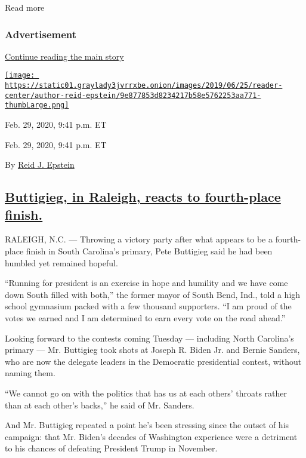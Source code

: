 Read more

\hypertarget{advertisement}{%
\subsubsection{Advertisement}\label{advertisement}}

\protect\hyperlink{after-dfp-ad-mid1}{Continue reading the main story}

\href{https://www.nytimes3xbfgragh.onion/by/reid-j-epstein}{\texttt{[image: https://static01.graylady3jvrrxbe.onion/images/2019/06/25/reader-center/author-reid-epstein/9e877853d8234217b58e5762253aa771-thumbLarge.png]}}

Feb. 29, 2020, 9:41 p.m. ET

Feb. 29, 2020, 9:41 p.m. ET

By \href{https://www.nytimes3xbfgragh.onion/by/reid-j-epstein}{Reid J.
Epstein}

\hypertarget{buttigieg-in-raleigh-reacts-to-fourth-place-finish}{%
\subsection{\texorpdfstring{\protect\hyperlink{pete-buttigieg-speech}{Buttigieg,
in Raleigh, reacts to fourth-place
finish.}}{Buttigieg, in Raleigh, reacts to fourth-place finish.}}\label{buttigieg-in-raleigh-reacts-to-fourth-place-finish}}

RALEIGH, N.C. --- Throwing a victory party after what appears to be a
fourth-place finish in South Carolina's primary, Pete Buttigieg said he
had been humbled yet remained hopeful.

``Running for president is an exercise in hope and humility and we have
come down South filled with both,'' the former mayor of South Bend,
Ind., told a high school gymnasium packed with a few thousand
supporters. ``I am proud of the votes we earned and I am determined to
earn every vote on the road ahead.''

Looking forward to the contests coming Tuesday --- including North
Carolina's primary --- Mr. Buttigieg took shots at Joseph R. Biden Jr.
and Bernie Sanders, who are now the delegate leaders in the Democratic
presidential contest, without naming them.

``We cannot go on with the politics that has us at each others' throats
rather than at each other's backs,'' he said of Mr. Sanders.

And Mr. Buttigieg repeated a point he's been stressing since the outset
of his campaign: that Mr. Biden's decades of Washington experience were
a detriment to his chances of defeating President Trump in November.


